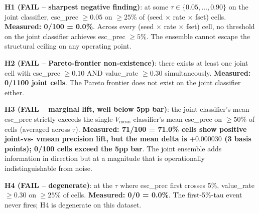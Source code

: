 \textbf{H1 (FAIL -- sharpest negative finding)}: at some
$\tau \in \{0.05, \dots, 0.90\}$ on the joint classifier, esc\_prec
$\geq 0.05$ on $\geq 25\%$ of (seed $\times$ rate $\times$ fset) cells.
\textbf{Measured: 0/100 = 0.0\%}. Across every (seed $\times$ rate
$\times$ fset) cell, no threshold on the joint classifier achieves
esc\_prec $\geq 5\%$. The ensemble cannot escape the structural
ceiling on any operating point.

\textbf{H2 (FAIL -- Pareto-frontier non-existence)}: there exists at
least one joint cell with esc\_prec $\geq 0.10$ AND value\_rate
$\geq 0.30$ simultaneously. \textbf{Measured: 0/1100 joint cells}.
The Pareto frontier does not exist on the joint classifier either.

\textbf{H3 (FAIL -- marginal lift, well below 5pp bar)}: the joint
classifier's mean esc\_prec strictly exceeds the single-$V_\mathrm{mean}$
classifier's mean esc\_prec on $\geq 50\%$ of cells (averaged across
$\tau$). \textbf{Measured: 71/100 = 71.0\% cells show positive joint-vs-
vmean precision lift, but the mean delta is $+0.000030$ (3 basis
points); 0/100 cells exceed the 5pp bar}. The joint ensemble adds
information in direction but at a magnitude that is operationally
indistinguishable from noise.

\textbf{H4 (FAIL -- degenerate)}: at the $\tau$ where esc\_prec first
crosses 5\%, value\_rate $\geq 0.30$ on $\geq 25\%$ of cells.
\textbf{Measured: 0/0 = 0.0\%}. The first-5\%-tau event never fires;
H4 is degenerate on this dataset.

